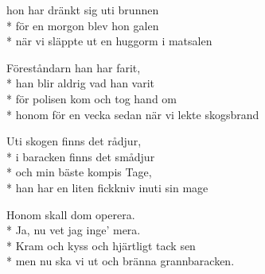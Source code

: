 \begin{SongText}
\begin{SongVerse}
hon har dränkt sig uti brunnen\\*%
för en morgon blev hon galen\\*%
när vi släppte ut en huggorm i matsalen
\end{SongVerse}
\begin{SongVerse}
Föreståndarn han har farit,\\*%
han blir aldrig vad han varit\\*%
för polisen kom och tog hand om\\*%
honom för en vecka sedan när vi lekte skogsbrand
\end{SongVerse}
\begin{SongVerse}
Uti skogen finns det rådjur,\\*%
i baracken finns det smådjur\\*%
och min bäste kompis Tage,\\*%
han har en liten fickkniv inuti sin mage
\end{SongVerse}
\begin{SongVerse}
Honom skall dom operera.\\*%
Ja, nu vet jag inge’ mera.\\*%
Kram och kyss och hjärtligt tack sen\\*%
men nu ska vi ut och bränna grannbaracken.
\end{SongVerse}
\end{SongText}
